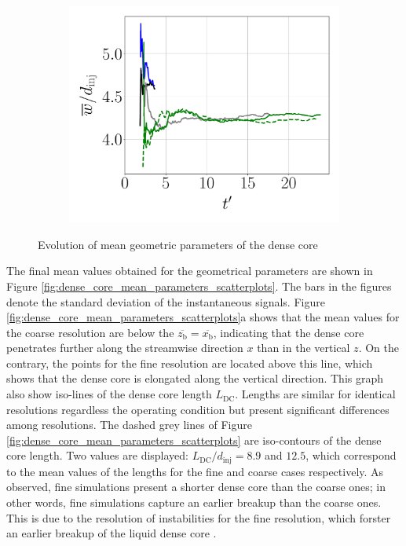 \begin{figure}[ht]
\hfill
\begin{subfigure}[b]{0.3\textwidth}
	\flushleft
   \includegraphics[scale=0.225]{./part2_developments/figures_ch5_resolved_JICF/results_dense_core_modeling/convergence_mean_width}
\end{subfigure}
   \caption{Evolution of mean geometric parameters of the dense core}
\label{fig:dense_core_mean_parameters_convergence}
\end{figure}

The final mean values obtained for the geometrical parameters are shown in Figure \ref{fig:dense_core_mean_parameters_scatterplots}. The bars in the figures denote the standard deviation of the instantaneous signals. Figure \ref{fig:dense_core_mean_parameters_scatterplots}a shows that the mean values for the coarse resolution are below the $\overline{z_\mathrm{b}} = \overline{x_\mathrm{b}}$, indicating that the dense core penetrates further along the streamwise direction $x$ than in the vertical $z$. On the contrary, the points for the fine resolution are located above this line, which shows that the dense core is elongated along the vertical direction. This graph also show iso-lines of the dense core length $L_\mathrm{DC}$. Lengths are similar for identical resolutions regardless the operating condition but present significant differences among resolutions. The dashed grey lines of Figure \ref{fig:dense_core_mean_parameters_scatterplots} are iso-contours of the dense core length.  Two values are displayed: $L_\mathrm{DC}/d_\mathrm{inj} = 8.9$ and $12.5$, which correspond to the mean values of the lengths for the fine and coarse cases respectively. As observed, fine simulations present a shorter dense core than the coarse ones; in other words, fine simulations capture an earlier breakup than the coarse ones. This is due to the resolution of instabilities for the fine resolution, which forster an earlier breakup of the liquid dense core .

